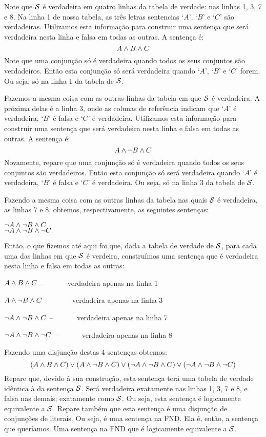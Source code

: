 \noindent Note que $\mathcal{S}$ é verdadeira em quatro linhas da tabela de verdade: nas linhas 1, 3, 7 e 8.
Na linha 1 de nossa tabela, as três letras sentencias `$A$', `$B$' e `$C$' são verdadeiras.
Utilizamos esta informação para construir uma sentença que será verdadeira nesta linha e falsa em todas as outras.
A sentença é: 
		$$A \wedge B \wedge C$$
Note que uma conjunção só é verdadeira quando todos os seus conjuntos são verdadeiros.
Então esta conjunção só será verdadeira quando `$A$', `$B$' e `$C$' forem.
Ou seja, só na linha 1 da tabela de $\mathcal{S}$.

Fazemos a mesma coisa com as outras linhas da tabela em que $\mathcal{S}$ é verdadeira.
A próxima delas  é a linha 3, onde as colunas de referência indicam que `$A$' é verdadeira, `$B$' é falsa e `$C$' é verdadeira.
Utilizamos esta informação para construir uma sentença que será verdadeira nesta linha e falsa em todas as outras.
A sentença é: 
		$$A \wedge \neg B \wedge C$$
Novamente, repare que uma conjunção só é verdadeira quando todos os seus conjuntos são verdadeiros. Então esta conjunção só será verdadeira quando `$A$' é verdadeira, `$B$' é falsa e `$C$' é verdadeira.
Ou seja, só na linha 3 da tabela de $\mathcal{S}$.

Fazendo a mesma coisa com as outras linhas da tabela nas quais $\mathcal{S}$ é verdadeira, as linhas 7 e 8, obtemos, respectivamente, as seguintes sentenças:
\begin{center}
		$\neg A \wedge \neg B \wedge C$ \\
		$\neg A \wedge \neg B \wedge \neg C$
\end{center}
Então, o que fizemos até aqui foi que, dada a tabela de verdade de $\mathcal{S}$, para cada uma das linhas em que $\mathcal{S}$ é verdeira, construímos uma sentença que é verdadeira nesta linha e falsa em todas as outras:
	\begin{earg}
		\item[]   $A \wedge B \wedge C$ \hfill  -- \ \ \ \ \ \ verdadeira apenas na linha 1
		\item[]  $A \wedge \neg B \wedge C$ \hfill  -- \ \ \ \ \ \  verdadeira apenas na linha 3
		\item[]  $\neg A \wedge \neg B \wedge C$ \hfill  -- \ \ \ \ \ \  verdadeira apenas na linha 7
		\item[]  $\neg A \wedge \neg B \wedge \neg C$ \hfill  -- \ \ \ \ \ \  verdadeira apenas na linha 8
	\end{earg}
Fazendo uma disjunção destas 4 sentenças obtemos:
$$(A \wedge B \wedge C) \vee (A \wedge \neg B \wedge C) \vee (\neg A \wedge \neg B \wedge C) \vee (\neg A \wedge \neg B \wedge \neg C)$$\label{longDNF}
Repare que, devido à sua construção, esta sentença terá uma tabela de verdade idêntica à da sentença $\mathcal{S}$. Será verdadeira exatamente nas linhas 1, 3, 7 e 8, e falsa nas demais; exatamente como  $\mathcal{S}$.
Ou seja, esta sentença é logicamente equivalente a $\mathcal{S}$.
Repare também que esta sentença é uma disjunção de conjunções de literais. Ou seja, é uma sentença na FND.
Ela é, então, a sentença que queríamos.
Uma sentença na FND que é logicamente equivalente a $\mathcal{S}$.

